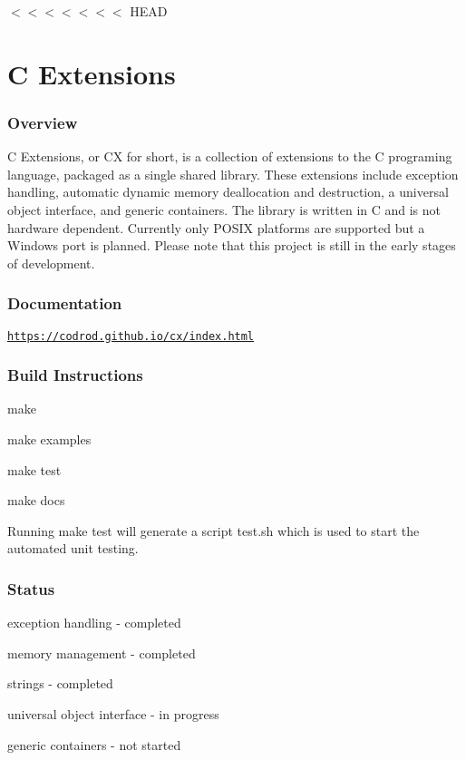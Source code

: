 $<$$<$$<$$<$$<$$<$$<$ H\+E\+AD \section*{C Extensions }

\subsubsection*{Overview}

C Extensions, or CX for short, is a collection of extensions to the C programing language, packaged as a single shared library. These extensions include exception handling, automatic dynamic memory deallocation and destruction, a universal object interface, and generic containers. The library is written in C and is not hardware dependent. Currently only P\+O\+S\+IX platforms are supported but a Windows port is planned. Please note that this project is still in the early stages of development.

\subsubsection*{Documentation}

\href{https://codrod.github.io/cx/index.html}{\tt https\+://codrod.\+github.\+io/cx/index.\+html}

\subsubsection*{Build Instructions}


\begin{DoxyItemize}
\item make
\item make examples
\item make test
\item make docs
\end{DoxyItemize}

Running \textquotesingle{}make test\textquotesingle{} will generate a script \textquotesingle{}test.\+sh\textquotesingle{} which is used to start the automated unit testing.

\subsubsection*{Status}


\begin{DoxyItemize}
\item exception handling -\/ completed
\item memory management -\/ completed
\item strings -\/ completed
\item universal object interface -\/ in progress
\item generic containers -\/ not started
\end{DoxyItemize}

